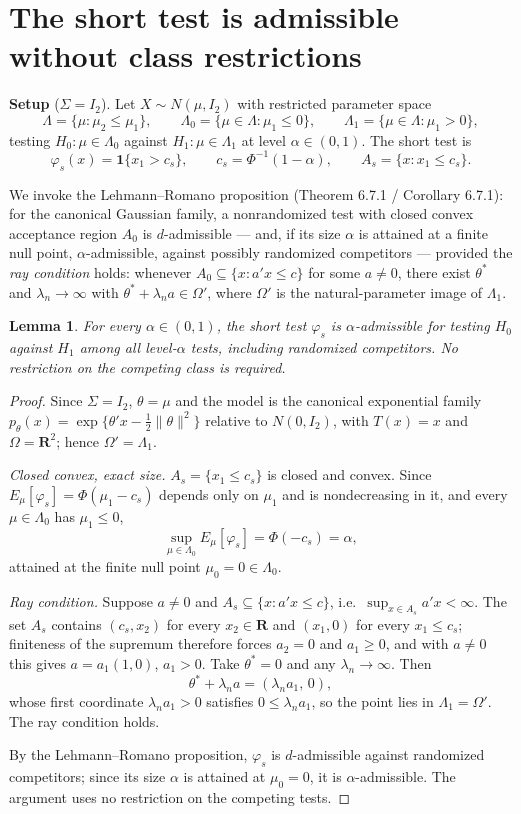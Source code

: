 \documentclass[12pt]{article}
\newtheorem{lemma}{Lemma}
\begin{document}
\section*{The short test is admissible without class restrictions}

\noindent\textbf{Setup} ($\Sigma=I_2$). Let $X\sim N(\mu,I_2)$ with restricted parameter space
\[
\Lambda=\{\mu:\mu_2\le\mu_1\},\qquad
\Lambda_0=\{\mu\in\Lambda:\mu_1\le0\},\qquad
\Lambda_1=\{\mu\in\Lambda:\mu_1>0\},
\]
testing $H_0:\mu\in\Lambda_0$ against $H_1:\mu\in\Lambda_1$ at level $\alpha\in(0,1)$. The short test is
\[
\varphi_s(x)=\mathbf 1\{x_1>c_s\},\qquad c_s=\Phi^{-1}(1-\alpha),\qquad
A_s=\{x:x_1\le c_s\}.
\]

We invoke the Lehmann--Romano proposition (Theorem 6.7.1 / Corollary 6.7.1): for the canonical Gaussian family, a nonrandomized test with closed convex acceptance region $A_0$ is $d$-admissible --- and, if its size $\alpha$ is attained at a finite null point, $\alpha$-admissible, against possibly randomized competitors --- provided the \emph{ray condition} holds: whenever $A_0\subseteq\{x:a'x\le c\}$ for some $a\ne0$, there exist $\theta^*$ and $\lambda_n\to\infty$ with $\theta^*+\lambda_n a\in\Omega'$, where $\Omega'$ is the natural-parameter image of $\Lambda_1$.

\begin{lemma}
For every $\alpha\in(0,1)$, the short test $\varphi_s$ is $\alpha$-admissible for testing $H_0$ against $H_1$ among all level-$\alpha$ tests, including randomized competitors. No restriction on the competing class is required.
\end{lemma}

\begin{proof}
Since $\Sigma=I_2$, $\theta=\mu$ and the model is the canonical exponential family $p_\theta(x)=\exp\{\theta'x-\tfrac12\|\theta\|^2\}$ relative to $N(0,I_2)$, with $T(x)=x$ and $\Omega=\mathbf R^2$; hence $\Omega'=\Lambda_1$.

\emph{Closed convex, exact size.} $A_s=\{x_1\le c_s\}$ is closed and convex. Since $E_\mu[\varphi_s]=\Phi(\mu_1-c_s)$ depends only on $\mu_1$ and is nondecreasing in it, and every $\mu\in\Lambda_0$ has $\mu_1\le0$,
\[
\sup_{\mu\in\Lambda_0}E_\mu[\varphi_s]=\Phi(-c_s)=\alpha,
\]
attained at the finite null point $\mu_0=0\in\Lambda_0$.

\emph{Ray condition.} Suppose $a\ne0$ and $A_s\subseteq\{x:a'x\le c\}$, i.e.\ $\sup_{x\in A_s}a'x<\infty$. The set $A_s$ contains $(c_s,x_2)$ for every $x_2\in\mathbf R$ and $(x_1,0)$ for every $x_1\le c_s$; finiteness of the supremum therefore forces $a_2=0$ and $a_1\ge0$, and with $a\ne0$ this gives $a=a_1(1,0)$, $a_1>0$. Take $\theta^*=0$ and any $\lambda_n\to\infty$. Then
\[
\theta^*+\lambda_n a=(\lambda_n a_1,\,0),
\]
whose first coordinate $\lambda_n a_1>0$ satisfies $0\le\lambda_n a_1$, so the point lies in $\Lambda_1=\Omega'$. The ray condition holds.

By the Lehmann--Romano proposition, $\varphi_s$ is $d$-admissible against randomized competitors; since its size $\alpha$ is attained at $\mu_0=0$, it is $\alpha$-admissible. The argument uses no restriction on the competing tests.
\end{proof}
\end{document}
